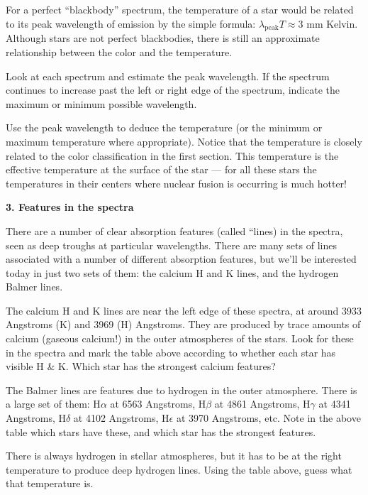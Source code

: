 \noindent For a perfect ``blackbody'' spectrum, the temperature of a
star would be related to its peak wavelength of emission by the simple
formula: $\lambda_{\mathrm{peak}} T \approx 3$ mm Kelvin. Although
stars are not perfect blackbodies, there is still an approximate
relationship between the color and the temperature.

\noindent Look at each spectrum and estimate the peak wavelength.  If
the spectrum continues to increase past the left or right edge of the
spectrum, indicate the maximum or minimum possible wavelength. 

\noindent Use the peak wavelength to deduce the temperature (or the
minimum or maximum temperature where appropriate).  Notice that the
temperature is closely related to the color classification in the
first section. This temperature is the effective temperature at the
surface of the star --- for all these stars the temperatures in their
centers where nuclear fusion is occurring is much hotter!

\noindent
{\bf 3. Features in the spectra}

\noindent There are a number of clear absorption features (called
``lines) in the spectra, seen as deep troughs at particular
wavelengths. There are many sets of lines associated with a number of
different absorption features, but we'll be interested today in just
two sets of them: the calcium H and K lines, and the hydrogen Balmer
lines.

\noindent The calcium H and K lines are near the left edge of these
spectra, at around 3933 Angstroms (K) and 3969 (H) Angstroms. They are
produced by trace amounts of calcium (gaseous calcium!) in the outer
atmospheres of the stars. Look for these in the spectra and mark the
table above according to whether each star has visible H \& K.  Which
star has the strongest calcium features?

\noindent The Balmer lines are features due to hydrogen in the outer
atmosphere. There is a large set of them: H$\alpha$ at 6563 Angstroms,
H$\beta$ at 4861 Angstroms, H$\gamma$ at 4341 Angstroms, H$\delta$ at
4102 Angstroms, H$\epsilon$ at 3970 Angstroms, etc.  Note in the above
table which stars have these, and which star has the strongest
features.

\noindent 
There is always hydrogen in stellar atmospheres, but it has to be at
the right temperature to produce deep hydrogen lines. Using the table
above, guess what that temperature is.

\vspace{30pt}

